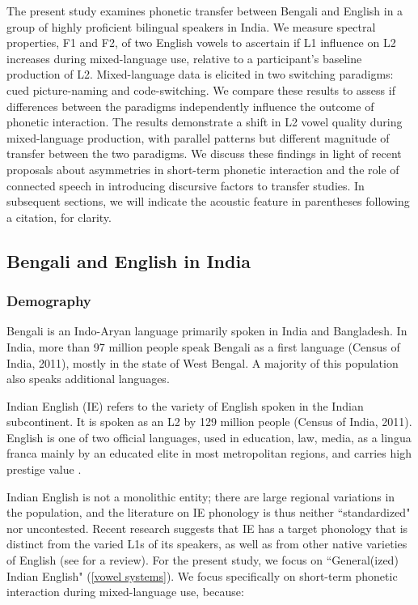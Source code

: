 \documentclass[12 pt]{article}
\begin{document}
The present study examines phonetic transfer between Bengali and English in a group of highly proficient bilingual speakers in India. We measure spectral properties, F1 and F2, of two English vowels to ascertain if L1 influence on L2 increases during mixed-language use, relative to a participant's baseline production of L2. Mixed-language data is elicited in two switching paradigms: cued picture-naming and code-switching. We compare these results to assess if differences between the paradigms independently influence the outcome of phonetic interaction. The results demonstrate a shift in L2 vowel quality during mixed-language production, with parallel patterns but different magnitude of transfer between the two paradigms. We discuss these findings in light of recent proposals about asymmetries in short-term phonetic interaction and the role of connected speech in introducing discursive factors to transfer studies. In subsequent sections, we will indicate the acoustic feature in parentheses following a citation, for clarity. 

\subsection{Bengali and English in India} \label{bengali_english_in_india}

\subsubsection*{Demography} 

Bengali is an Indo-Aryan language primarily spoken in India and Bangladesh. In India, more than 97 million people speak Bengali as a first language (Census of India, 2011), mostly in the state of West Bengal. A majority of this population also speaks additional languages.

Indian English (IE) refers to the variety of English spoken in the Indian subcontinent. It is spoken as an L2 by 129 million people (Census of India, 2011).  English is one of two official languages, used in education, law, media, as a lingua franca mainly by an educated elite in most metropolitan regions, and carries high prestige value \citep{pandey201517, kachru1981english, tollefson2014language, kachru1983indianization}.

Indian English is not a monolithic entity; there are large regional variations in the population, and the literature on IE phonology is thus neither ``standardized" nor uncontested. Recent research suggests that IE has a target phonology that is distinct from the varied L1s of its speakers, as well as from other native varieties of English (see \cite{sirsa2013effects} for a review). For the present study, we focus on ``General(ized) Indian English" \citep{masica1972sound} (\ref{vowel systems}). We focus specifically on short-term phonetic interaction during mixed-language use, because:
\end{document}
